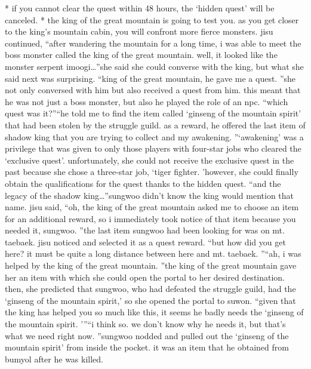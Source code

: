 * if you cannot clear the quest within 48 hours, the ‘hidden quest’ will be canceled.
* the king of the great mountain is going to test you.
 as you get closer to the king’s mountain cabin, you will confront more fierce monsters.
jisu continued, “after wandering the mountain for a long time, i was able to meet the boss monster called the king of the great mountain.
 well, it looked like the monster serpent imoogi…”she said she could converse with the king, but what she said next was surprising.
“king of the great mountain, he gave me a quest.
”she not only conversed with him but also received a quest from him.
 this meant that he was not just a boss monster, but also he played the role of an npc.
“which quest was it?”“he told me to find the item called ‘ginseng of the mountain spirit’ that had been stolen by the struggle guild.
 as a reward, he offered the last item of shadow king that you are trying to collect and my awakening.
”‘awakening’ was a privilege that was given to only those players with four-star jobs who cleared the ‘exclusive quest’.
 unfortunately, she could not receive the exclusive quest in the past because she chose a three-star job, ‘tiger fighter.
’however, she could finally obtain the qualifications for the quest thanks to the hidden quest.
“and the legacy of the shadow king…”sungwoo didn’t know the king would mention that name.
jisu said, “oh, the king of the great mountain asked me to choose an item for an additional reward, so i immediately took notice of that item because you needed it, sungwoo.
”the last item sungwoo had been looking for was on mt.
 taebaek.
jisu noticed and selected it as a quest reward.
“but how did you get here? it must be quite a long distance between here and mt.
 taebaek.
”“ah, i was helped by the king of the great mountain.
”the king of the great mountain gave her an item with which she could open the portal to her desired destination.
then, she predicted that sungwoo, who had defeated the struggle guild, had the ‘ginseng of the mountain spirit,’ so she opened the portal to suwon.
“given that the king has helped you so much like this, it seems he badly needs the ‘ginseng of the mountain spirit.
'”“i think so.
 we don’t know why he needs it, but that’s what we need right now.
”sungwoo nodded and pulled out the ‘ginseng of the mountain spirit’ from inside the pocket.
it was an item that he obtained from bumyol after he was killed.


 